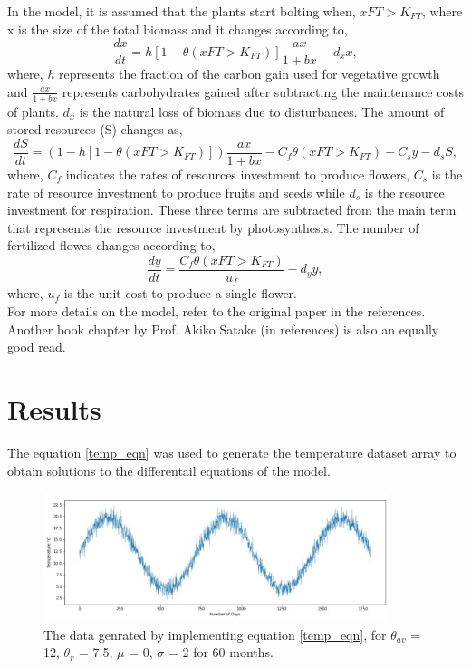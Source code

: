 \documentclass[10 pt]{article}
\begin{document}
In the model, it is assumed that the plants start bolting when, 
$xFT > K_{FT}$,
where x is the size of the total biomass and it changes according to,
\begin{equation} 
\frac{dx}{dt} = h[1-\theta(xFT > K_{FT})] \frac{ax}{1+bx} - d_{x}x,
\end{equation}
where, $h$ represents the fraction of the carbon gain used for vegetative growth and $\frac{ax}{1+bx}$ represents carbohydrates gained after subtracting the maintenance costs of plants. $d_{x}$ is the natural loss of biomass due to disturbances. The amount of stored resources (S) changes as,
\begin{equation} 
\frac{dS}{dt} = (1-h[1-\theta(xFT > K_{FT})]) \frac{ax}{1+bx} - C_{f} \theta(xFT > K_{FT}) - C_{s}y - d_{s}S,
\end{equation} 
where, $C_{f}$ indicates the rates of resources investment to produce flowers, $C_{s}$ is the rate of resource investment to produce fruits and seeds while $d_{s}$ is the resource investment for respiration. These three terms are subtracted from the main term that represents the resource investment by photosynthesis. The number of fertilized flowes changes according to,
\begin{equation}
\frac{dy}{dt} = \frac{C_{f}\theta(xFT > K_{FT})}{u_{f}} - d_{y}y,
\end{equation}
where, $u_{f}$ is the unit cost to produce a single flower. \\
For more details on the model, refer to the original paper in the references. Another book chapter by Prof. Akiko Satake (in references) is also an equally good read.

\section{Results}

The equation \ref{temp_eqn} was used to generate the temperature dataset array to obtain solutions to the differentail equations of the model. 

\begin{figure}[h]
\includegraphics[width=0.9\textwidth]{Temp_1.png}
\caption{The data genrated by implementing equation \ref{temp_eqn}, for $\theta_{av}$ = 12, $\theta_{r}$ = 7.5, $\mu$ = 0, $\sigma$ = 2 for 60 months.}
\end{figure}
\end{document}
